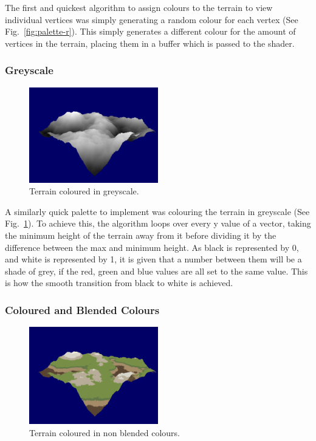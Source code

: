 \documentclass[a4paper,10pt]{report}
\begin{document}
The first and quickest algorithm to assign colours to the terrain to view individual vertices was simply generating a random colour for each vertex (See Fig.~\ref{fig:palette-r}). This simply generates a different colour for the amount of vertices in the terrain, placing them in a buffer which is passed to the shader. 

\subsubsection{Greyscale}
\begin{figure}[ht!]
    \centering
  \includegraphics[width=0.5\textwidth]{Images/Screenshots/palette-g.png}
 \caption{Terrain coloured in greyscale.}
 \label{fig:palette-g}
\end{figure}

A similarly quick palette to implement was colouring the terrain in greyscale (See Fig.~\ref{fig:palette-g}). To achieve this, the algorithm loops over every y value of a vector, taking the minimum height of the terrain away from it before dividing it by the difference between the max and minimum height. As black is represented by 0, and white is represented by 1, it is given that a number between them will be a shade of grey, if the red, green and blue values are all set to the same value. This is how the smooth transition from black to white is achieved. 
\subsubsection{Coloured and Blended Colours}
\begin{figure}[ht!]
    \centering
  \includegraphics[width=0.5\textwidth]{Images/Screenshots/palette-c.png}
 \caption{Terrain coloured in non blended colours.}
 \label{fig:palette-c}
\end{figure}
\end{document}
